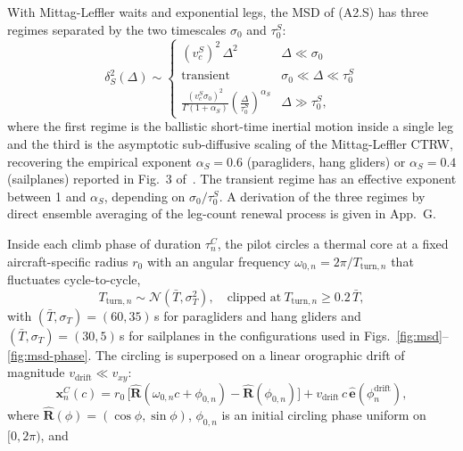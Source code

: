 \documentclass[11pt,a4paper]{article}
\begin{document}
\begin{description}
\begin{description}
With Mittag-Leffler waits and exponential legs, the MSD of (A2.S)
has three regimes separated by the two timescales $\sigma_0$ and
$\tau_0^S$:
\begin{equation}
\delta^2_S(\Delta) \sim
\begin{cases}
 (v_c^S)^2\,\Delta^2 & \Delta \ll \sigma_0 \\
 \text{transient} & \sigma_0 \ll \Delta \ll \tau_0^S \\
 \frac{(v_c^S\sigma_0)^2}{\Gamma(1+\alpha_S)}
  \left(\frac{\Delta}{\tau_0^S}\right)^{\alpha_S}
 & \Delta \gg \tau_0^S,
\end{cases}
\label{eq:msd-search-subdiff}
\end{equation}
where the first regime is the ballistic short-time inertial motion
inside a single leg and the third is the asymptotic sub-diffusive
scaling of the Mittag-Leffler CTRW, recovering the empirical exponent
$\alpha_S = 0.6$ (paragliders, hang gliders) or $\alpha_S = 0.4$
(sailplanes) reported in Fig.~3 of~\cite{vilpellet2026}. The
transient regime has an effective exponent between 1 and
$\alpha_S$, depending on $\sigma_0/\tau_0^S$. A derivation of the
three regimes by direct ensemble averaging of the leg-count
renewal process is given in App.~G.
\item[(A2.C) Climb: 2D harmonic oscillator plus drift with
per-cycle turn-period dispersion.] Inside each climb phase of
duration $\tau^C_n$, the pilot circles a thermal core at a fixed
aircraft-specific radius $r_0$ with an angular frequency
$\omega_{0,n} = 2\pi/T_{\mathrm{turn},n}$ that fluctuates
cycle-to-cycle,
\begin{equation}
T_{\mathrm{turn},n} \sim \mathcal{N}(\bar{T},\sigma_T^2),
\quad\text{clipped at}\ T_{\mathrm{turn},n}\ge 0.2\,\bar{T},
\label{eq:Tturn-Gaussian}
\end{equation}
with $(\bar{T},\sigma_T)=(60,35)$\,s for paragliders and hang
gliders and $(\bar{T},\sigma_T)=(30,5)$\,s for sailplanes in the
configurations used in Figs.~\ref{fig:msd}--\ref{fig:msd-phase}. The circling is
superposed on a linear orographic drift of magnitude
$v_{\mathrm{drift}} \ll v_{xy}$:
\begin{equation}
\mathbf{x}^C_n(c) = r_0\,\bigl[
  \hat{\mathbf{R}}(\omega_{0,n} c + \phi_{0,n}) - \hat{\mathbf{R}}(\phi_{0,n})
\bigr] + v_{\mathrm{drift}}\,c\,\hat{\mathbf{e}}(\phi_n^{\mathrm{drift}}),
\label{eq:climb-oscillator}
\end{equation}
where $\hat{\mathbf{R}}(\phi) = (\cos\phi, \sin\phi)$, $\phi_{0,n}$
is an initial circling phase uniform on $[0, 2\pi)$, and

\end{description}
\end{description}
\end{document}
